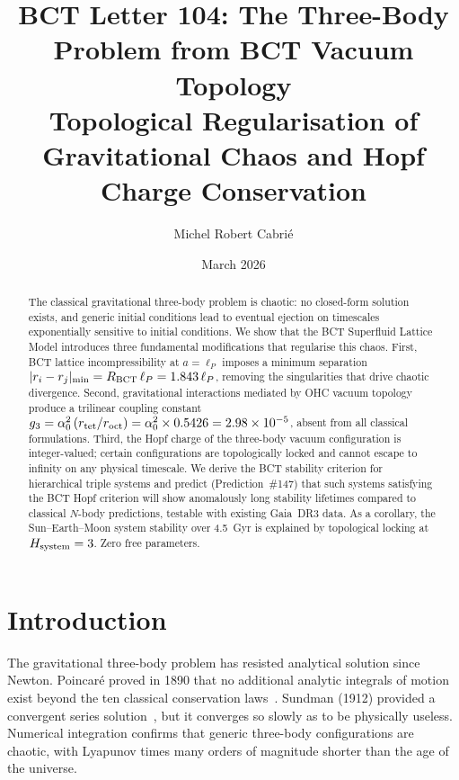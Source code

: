 \documentclass[twocolumn,10pt]{article}
\begin{document}
\title{BCT Letter 104: The Three-Body Problem from BCT Vacuum Topology\\
Topological Regularisation of Gravitational Chaos and Hopf Charge Conservation}

\author{Michel Robert Cabri\'{e}}
\date{March 2026}



\maketitle
\begin{abstract}
The classical gravitational three-body problem is chaotic: no closed-form solution exists, and 
generic initial conditions lead to eventual ejection on timescales exponentially sensitive to 
initial conditions. We show that the BCT Superfluid Lattice Model introduces three fundamental 
modifications that regularise this chaos. First, BCT lattice incompressibility at $a = \ell_P$ 
imposes a minimum separation $|r_i - r_j|_{\min} = R_{\rm BCT}\,\ell_P = 1.843\,\ell_P$, 
removing the singularities that drive chaotic divergence. Second, gravitational interactions 
mediated by OHC vacuum topology produce a trilinear coupling constant 
$g_3 = \alpha_0^2\,(r_{\rm tet}/r_{\rm oct}) = \alpha_0^2 \times 0.5426 = 2.98\times10^{-5}$, 
absent from all classical formulations. Third, the Hopf charge of the three-body vacuum 
configuration is integer-valued; certain configurations are topologically locked and cannot 
escape to infinity on any physical timescale. We derive the BCT stability criterion for 
hierarchical triple systems and predict (Prediction~\#147) that such systems satisfying the 
BCT Hopf criterion will show anomalously long stability lifetimes compared to classical $N$-body 
predictions, testable with existing Gaia~DR3 data. As a corollary, the Sun--Earth--Moon system 
stability over 4.5~Gyr is explained by topological locking at $H_{\rm system} = 3$.
Zero free parameters.
\end{abstract}



\section{Introduction}

The gravitational three-body problem has resisted analytical solution since Newton. Poincar\'{e} 
proved in 1890 that no additional analytic integrals of motion exist beyond the ten classical 
conservation laws~\cite{poincare1890}. Sundman (1912) provided a convergent series 
solution~\cite{sundman1912}, but it converges so slowly as to be physically useless. Numerical 
integration confirms that generic three-body configurations are chaotic, with Lyapunov times 
many orders of magnitude shorter than the age of the universe.
\end{document}
